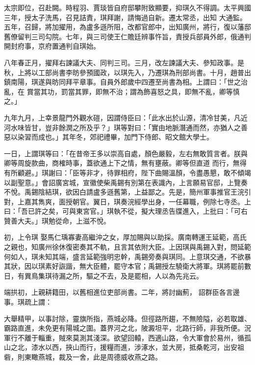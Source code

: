 \begin{pinyinscope}
 太宗即位，召赴闕。時程羽、賈琰皆自府邸攀附致顯要，抑琪久不得調。太平興國三年，授太子洗馬，召見詰責，琪拜謝，請悔過自新。遷太常丞，出知
 大通監。五年，召歸，將加擢用，為盧多遜所阻，改都官郎中，出知廣州，將行，復以藩邸舊僚留判三司勾院。七年，與三司使王仁贍廷辨事忤旨，責授兵部員外郎，俄通判開封府事，京府置通判自琪始。



 八年春正月，擢拜右諫議大夫、同判三司。三月，改左諫議大夫、參知政事。是秋，上將以工部尚書李昉參預國政，以琪先入，乃遷琪為刑部尚書。十月，趙普出鎮南陽，琪遂與昉同拜平章事。自員外郎歲中四遷至尚書為相。上謂曰：「世之治亂，在
 賞當其功，罰當其罪，即無不治；謂為飾喜怒之具，即無不亂，卿等慎之。」



 九年九月，上幸景龍門外觀水磑，因謂侍臣曰：「此水出於山源，清冷甘美，凡近河水味皆甘，豈非餘潤之所及乎？」琪等對曰：「實由地脈潛通而然，亦猶人之善惡以染習而成也。」其年冬，郊祀禮畢，加門下侍郎、昭文館大學士。



 一日，上謂琪等曰：「在昔帝王多以崇高自處，顏色嚴毅，左右無敢質言者。朕與卿等周旋款曲，商榷時事，蓋欲通上下之情，無有壅蔽。卿等但直道
 而行，無得有所顧避。」琪謝曰：「臣等非才，待罪相府，陛下曲賜溫顏，令盡愚懇，敢不傾竭以副聖意。」會詔廣宮城，宣徽使柴禹錫有別第在表識內，上言願易官邸，上覽奏不悅。禹錫陰結琪，欲因白請盧多遜舊第，上益鄙之。先是，簡州軍事推官王浣引對，上嘉其雋爽，面授朝官。翼日，琪奏浣經學出身，一任幕職，例除七寺丞。上曰：「吾已許之矣，可與東宮官。」琪執不從，擬大理丞告牒進入，上批曰：「可右贊善大夫。」琪勉從命，上滋不悅。



 初，上令琪
 娶馬仁瑀寡妻高繼沖之女，厚加賜與以助採。廣南轉運王延範，高氏之親也，知廣州徐休復密奏其不軌，且言其依附大臣。上因琪與禹錫入對，問延範何如人，琪未知其端，盛言延範強明忠幹，禹錫旁奏與琪同。上意琪交通，不欲暴其狀，因以琪素好詼諧，無大臣體，罷守本官；禹錫授左驍衛大將軍。琪將罷前數日，有異鳥集琪待漏之所，驅之不去，及是罷相，人以為先兆云。



 端拱初，上親耕籍田，以舊相進位吏部尚書。二年，將討幽薊，
 詔群臣各言邊事。琪疏上謂：



 大舉精甲，以事討除，靈旗所指，燕城必降。但徑路所趨，不無險隘，必若取雄、霸路直進，未免更有陽城之圍。蓋界河之北，陂澱坦平，北路行師，非我所便。況軍行不離于輜重，賊來莫測其淺深。欲望回轅，西適山路，令大軍會於易州，循孤山之北，漆水以西，挾山而行，援糧而進，涉涿水，並大房，抵桑乾河，出安祖砦，則東瞰燕城，裁及一舍，此是周德威收燕之路。




\end{pinyinscope}
